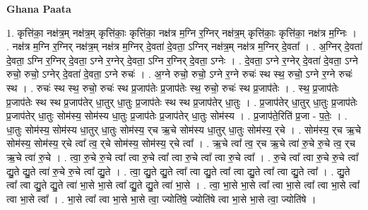 \documentclass[17pt]{extarticle}
\begin{document}
\textbf{Ghana Paata } \newline

1. कृत्ति॑का॒ नक्ष॑त्र॒म् नक्ष॑त्र॒म् कृत्ति॑काः॒ कृत्ति॑का॒ नक्ष॑त्र म॒ग्नि र॒ग्निर् नक्ष॑त्र॒म् कृत्ति॑काः॒ कृत्ति॑का॒ नक्ष॑त्र म॒ग्निः । . नक्ष॑त्र म॒ग्नि र॒ग्निर् नक्ष॑त्र॒म् नक्ष॑त्र म॒ग्निर् दे॒वता॑ दे॒वता॒ ऽग्निर् नक्ष॑त्र॒म् नक्ष॑त्र म॒ग्निर् दे॒वता᳚ । . अ॒ग्निर् दे॒वता॑ दे॒वता॒ ऽग्नि र॒ग्निर् दे॒वता॒ ऽग्ने र॒ग्नेर् दे॒वता॒ ऽग्नि र॒ग्निर् दे॒वता॒ ऽग्नेः । . दे॒वता॒ ऽग्ने र॒ग्नेर् दे॒वता॑ दे॒वता॒ ऽग्ने रुचो॒ रुचो॒ ऽग्नेर् दे॒वता॑ दे॒वता॒ ऽग्ने रुचः॑ । . अ॒ग्ने रुचो॒ रुचो॒ ऽग्ने र॒ग्ने रुचः॑ स्थ स्थ॒ रुचो॒ ऽग्ने र॒ग्ने रुचः॑ स्थ । . रुचः॑ स्थ स्थ॒ रुचो॒ रुचः॑ स्थ प्र॒जाप॑तेः प्र॒जाप॑तेः स्थ॒ रुचो॒ रुचः॑ स्थ प्र॒जाप॑तेः । . स्थ॒ प्र॒जाप॑तेः प्र॒जाप॑तेः स्थ स्थ प्र॒जाप॑तेर् धा॒तुर् धा॒तुः प्र॒जाप॑तेः स्थ स्थ प्र॒जाप॑तेर् धा॒तुः । . प्र॒जाप॑तेर् धा॒तुर् धा॒तुः प्र॒जाप॑तेः प्र॒जाप॑तेर् धा॒तुः सोम॑स्य॒ सोम॑स्य धा॒तुः प्र॒जाप॑तेः प्र॒जाप॑तेर् धा॒तुः सोम॑स्य । . प्र॒जाप॑ते॒रिति॑ प्र॒जा - प॒तेः॒ । . धा॒तुः सोम॑स्य॒ सोम॑स्य धा॒तुर् धा॒तुः सोम॑स्य॒ र्‌च ऋ॒चे सोम॑स्य धा॒तुर् धा॒तुः सोम॑स्य॒ र्‌चे । . सोम॑स्य॒ र्‌च ऋ॒चे सोम॑स्य॒ सोम॑स्य॒ र्‌चे त्वा᳚ त्व॒ र्‌चे सोम॑स्य॒ सोम॑स्य॒ र्‌चे त्वा᳚ । . ऋ॒चे त्वा᳚ त्व॒ र्‌च ऋ॒चे त्वा॑ रु॒चे रु॒चे त्व॒ र्‌च ऋ॒चे त्वा॑ रु॒चे । . त्वा॒ रु॒चे रु॒चे त्वा᳚ त्वा रु॒चे त्वा᳚ त्वा रु॒चे त्वा᳚ त्वा रु॒चे त्वा᳚ । . रु॒चे त्वा᳚ त्वा रु॒चे रु॒चे त्वा᳚ द्यु॒ते द्यु॒ते त्वा॑ रु॒चे रु॒चे त्वा᳚ द्यु॒ते । . त्वा॒ द्यु॒ते द्यु॒ते त्वा᳚ त्वा द्यु॒ते त्वा᳚ त्वा द्यु॒ते त्वा᳚ त्वा द्यु॒ते त्वा᳚ । . द्यु॒ते त्वा᳚ त्वा द्यु॒ते द्यु॒ते त्वा॑ भा॒से भा॒से त्वा᳚ द्यु॒ते द्यु॒ते त्वा॑ भा॒से । . त्वा॒ भा॒से भा॒से त्वा᳚ त्वा भा॒से त्वा᳚ त्वा भा॒से त्वा᳚ त्वा भा॒से त्वा᳚ । . भा॒से त्वा᳚ त्वा भा॒से भा॒से त्वा॒ ज्योति॑षे॒ ज्योति॑षे त्वा भा॒से भा॒से त्वा॒ ज्योति॑षे । \newline
\end{document}
